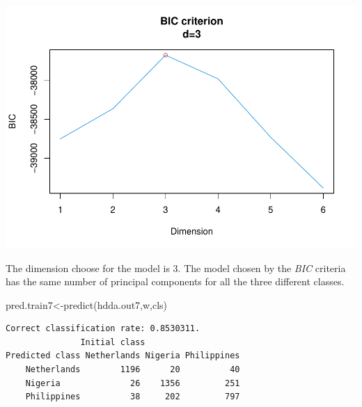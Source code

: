 \documentclass[
  11pt,
]{article}
\newenvironment{Shaded}{\begin{snugshade}}{\end{snugshade}}
\newcommand{\CommentTok}[1]{\textcolor[rgb]{0.56,0.35,0.01}{\textit{#1}}}
\newcommand{\FunctionTok}[1]{\textcolor[rgb]{0.00,0.00,0.00}{#1}}
\newcommand{\NormalTok}[1]{#1}
\newcommand{\OtherTok}[1]{\textcolor[rgb]{0.56,0.35,0.01}{#1}}
\newcommand{\SpecialCharTok}[1]{\textcolor[rgb]{0.00,0.00,0.00}{#1}}
\begin{document}
\includegraphics{report_files/figure-latex/Task_1_12-1.pdf}

The dimension choose for the model is \(3\). The model chosen by the \emph{BIC} criteria has the same number of principal components for all the three different classes.

\begin{Shaded}
\begin{Highlighting}[]
\NormalTok{pred.train7}\OtherTok{\textless{}{-}}\FunctionTok{predict}\NormalTok{(hdda.out7,w,cls)}
\end{Highlighting}
\end{Shaded}

\begin{verbatim}
Correct classification rate: 0.8530311.
               Initial class
Predicted class Netherlands Nigeria Philippines
    Netherlands        1196      20          40
    Nigeria              26    1356         251
    Philippines          38     202         797
\end{verbatim}

\begin{Shaded}
\end{Shaded}
\end{document}
